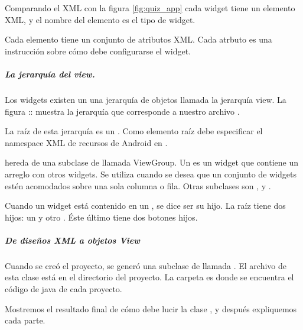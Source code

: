 Comparando el XML con la figura \ref{fig:quiz_app} cada widget tiene un elemento XML, y el
nombre del elemento es el tipo de widget.

Cada elemento tiene un conjunto de atributos XML. Cada atrbuto es una instrucción
sobre cómo debe configurarse el widget.


\subparagraph{La jerarquía del view.}
\label{\detokenize{dev_docs:la-jerarquia-del-view}}
Los widgets existen un una jerarquía de objetos  llamada la jerarquía
view. La figura :: muestra la jerarquía que corresponde a nuestro archivo
.

La raíz de esta jerarquía es un . Como elemento raíz debe especificar
el namespace XML de recursos de Android en .

 hereda de una subclase de  llamada ViewGroup. Un  es un
widget que contiene un arreglo con otros widgets. Se utiliza  cuando
se desea que un conjunto de widgets estén acomodados sobre una sola columna
o fila. Otras subclases  son ,  y .

Cuando un widget está contenido en un , se dice ser su hijo. La raíz
 tiene dos hijos: un  y otro . Éste último
tiene dos botones hijos.


\subparagraph{De diseños XML a objetos View}
\label{\detokenize{dev_docs:de-disenos-xml-a-objetos-view}}
Cuando se creó el proyecto, se generó una subclase de  llamada
. El archivo de esta clase está en el directorio  del
proyecto. La carpeta  es donde se encuentra el código de java de cada
proyecto.

Mostremos el resultado final de cómo debe lucir la clase ,
y después expliquemos cada parte.

